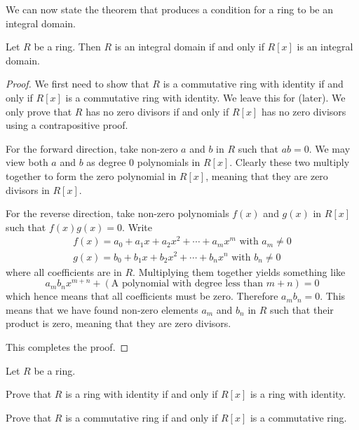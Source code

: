 We can now state the theorem that produces a condition for a ring to be an integral domain.
\begin{theorem}\label{thrm-integral-domain-iff-polynomial-ring-is-also}
    Let $R$ be a ring. Then $R$ is an integral domain if and only if $R[x]$ is an integral domain.
\end{theorem}
\begin{proof}
    We first need to show that $R$ is a commutative ring with identity if and only if $R[x]$ is a commutative ring with identity. We leave this for  (later). We only prove that $R$ has no zero divisors if and only if $R[x]$ has no zero divisors using a contrapositive proof.

    For the forward direction, take non-zero $a$ and $b$ in $R$ such that $ab = 0$. We may view both $a$ and $b$ as degree 0 polynomials in $R[x]$. Clearly these two multiply together to form the zero polynomial in $R[x]$, meaning that they are zero divisors in $R[x]$.

    For the reverse direction, take non-zero polynomials $f(x)$ and $g(x)$ in $R[x]$ such that $f(x)g(x) = 0$. Write
    \begin{align*}
        f(x) = a_0+a_1x+a_2x^2+\cdots+a_mx^m \text{ with } a_m \neq 0\\
        g(x) = b_0+b_1x+b_2x^2+\cdots+b_nx^n \text{ with } b_n \neq 0
    \end{align*}
    where all coefficients are in $R$. Multiplying them together yields something like
    \[
        a_mb_nx^{m+n} + (\text{A polynomial with degree less than }m+n) = 0
    \]
    which hence means that all coefficients must be zero. Therefore $a_mb_n = 0$. This means that we have found non-zero elements $a_m$ and $b_n$ in $R$ such that their product is zero, meaning that they are zero divisors.

    This completes the proof.
\end{proof}
\begin{exercise}\label{exercise-commutative-ring-with-identity-iff-polynomial-ring-is-also}
    Let $R$ be a ring.
    \begin{partquestions}{\alph*}
        \item Prove that $R$ is a ring with identity if and only if $R[x]$ is a ring with identity.
        \item Prove that $R$ is a commutative ring if and only if $R[x]$ is a commutative ring.
    \end{partquestions}
\end{exercise}

